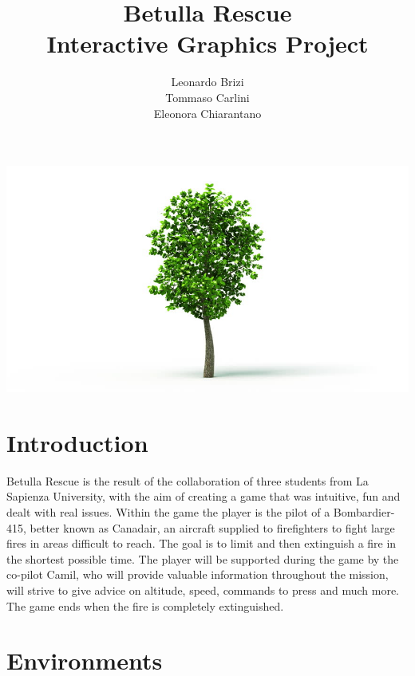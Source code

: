 \documentclass{article}
\title{Betulla Rescue \\ Interactive Graphics Project}
\author{Leonardo Brizi\\Tommaso Carlini\\Eleonora Chiarantano}
\begin{document}
\maketitle

\includegraphics[width=\linewidth]{ImmaginiReport/immag.png}

\newpage

\section*{Introduction}
Betulla Rescue is the result of the collaboration of three students from La Sapienza University, with the aim of creating a game that was intuitive, fun and dealt with real issues. Within the game the player is the pilot of a Bombardier-415, better known as Canadair, an aircraft supplied to firefighters to fight large fires in areas difficult to reach. The goal is to limit and then extinguish a fire in the shortest possible time. The player will be supported during the game by the co-pilot Camil, who will provide valuable information throughout the mission, will strive to give advice on altitude, speed, commands to press and much more. The game ends when the fire is completely extinguished.

\section*{Environments}
\end{document}
